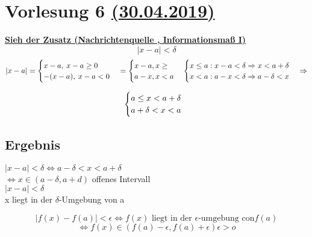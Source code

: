 \section{Vorlesung 6 \href{https://tu-dresden.de/mn/math/algebra/das-institut/beschaeftigte/antje-noack/ressourcen/dateien/v120-1/MathMethInf06.pdf?lang=en}{(30.04.2019)} }
\textbf{\href{https://tu-dresden.de/mn/math/algebra/das-institut/beschaeftigte/antje-noack/ressourcen/dateien/v120-1/MathMethInf06Zusatz.pdf?lang=en}{Sieh der Zusatz (Nachrichtenquelle , Informationsmaß I)}}
\[|x-a| < \delta \]
\begin{equation}
\\|x-a| = \begin{cases}
	x-a , \: x-a \geq 0  \\
	-(x-a),\:  x-a<0 \\
	\end{cases}
 = \begin{cases}
x-a , x \geq \\
a-x , x < a \\
\end{cases}	
 \begin{cases}
  x \leq a : x-a < \delta \Rightarrow x < a+\delta \\
  x<a : a-x < \delta \Rightarrow a-\delta < x	\end{cases} \Rightarrow 
\end{equation}


\begin{equation}
\\ \begin{cases}
a \leq x < a+\delta  \\
a+\delta < x < a \\
\end{cases}
\end{equation}
\subsection{Ergebnis}
$|x-a|<\delta \Leftrightarrow a-\delta < x < a+ \delta$ \\
$\Leftrightarrow x \in (a-\delta , a+d ) $ offenes Intervall \\
$|x-a| < \delta$ \\

 
 x liegt in der $\delta $-Umgebung von a
	
\[	|f(x) -f(a)| < \epsilon  \Leftrightarrow f(x)\text{ liegt in der }\epsilon\text{-umgebung con} f(a)
							 \] \[\Leftrightarrow f(x) \in \left( f(a)-\epsilon , f(a)+ \epsilon \right) \epsilon > o	 \]
 
